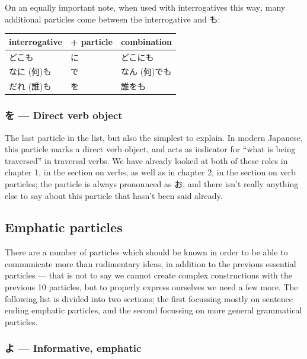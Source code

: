 \documentclass[11pt, b5paper, twoside, openright, onecolumn]{book}
\makeatletter
\newcommand*{\rtrubystack}[2]{{\relscale{0.5}%
  \begin{tabular}[b]{@{}c@{}}%
    {#1}\\%
    {\textscale{2}{#2}}%
  \end{tabular}}%
}
\DeclareRobustCommand*{\rtruby}[2]{%
  \mbox{%
    \setlength{\parskip}{0ex}%
    \BeginAccSupp{method=pdfstringdef,ActualText={#1}}%
      \rtrubystack{\phantom{#2}}{#1}%
      \llap{%
        \rtrubystack{#2}{\phantom{#1}}%
      }%
    \EndAccSupp{}%
  }%
}
\renewcommand*{\rtruby}[2]{#2 (#1)}%
\newenvironment{mytabular}[1]{\noindent\hspace{0.4in}
\begin{tabular}[h]{#1}}{\end{tabular}}
\makeatother
\begin{document}
On an equally important note‚ when used with interrogatives this way‚ many additional particles come between the interrogative and も:

\vspace{0.5cm}
\smaller
\begin{mytabular}{| l  l  l |}\hline 
\rule{0pt}{2.4ex}interrogative & + particle & combination\\ 
\hline
\rule{0pt}{2.4ex}どこも & に & どこにも\\ 
\rule{0pt}{3.6ex}\rtruby{何}{なに}も & で & \rtruby{何}{なん}でも\\ 
\rule{0pt}{3.6ex}\rtruby{誰}{だれ}も & を & 誰をも\\ 
\hline 
\end{mytabular}
\larger
\subsubsection{を — Direct verb object}


The last particle in the list‚ but also the simplest to explain. In modern Japanese‚ this particle marks a direct verb object‚ and acts as indicator for “what is being traversed” in traversal verbs. We have already looked at both of these roles in chapter 1‚ in the section on verbs‚ as well as in chapter 2‚ in the section on verb particles; the particle is always pronounced as お‚ and there isn’t really anything else to say about this particle that hasn’t been said already.

\subsection{Emphatic particles}

There are a number of particles which should be known in order to be able to communicate more than rudimentary ideas‚ in addition to the previous essential particles — that is not to say we cannot create complex constructions with the previous 10 particles‚ but to properly express ourselves we need a few more. The following list is divided into two sections; the first focussing mostly on sentence ending emphatic particles‚ and the second focussing on more general grammatical particles.

\subsubsection{よ — Informative‚ emphatic}
\end{document}
